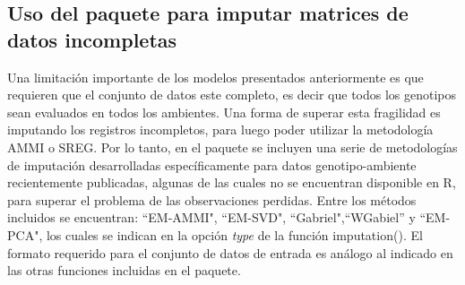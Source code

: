 

\subsection{Uso del paquete para imputar matrices de datos incompletas}
\label{subsec:metimp}

Una limitación importante de los modelos presentados anteriormente es que requieren que el conjunto de datos este completo, es decir que todos los genotipos sean evaluados en todos los ambientes. Una forma de superar esta fragilidad es imputando los registros incompletos, para luego poder utilizar la metodología AMMI o SREG. Por lo tanto, en el paquete se incluyen una serie de metodologías de imputación desarrolladas específicamente para datos genotipo-ambiente recientemente publicadas, algunas de las cuales no se encuentran disponible en R, para superar el problema de las observaciones perdidas. Entre los métodos incluidos se encuentran: ``EM-AMMI", ``EM-SVD", ``Gabriel",``WGabiel''  y ``EM-PCA", los cuales se indican en la opción \emph{type} de la función \textcolor{fandango}{imputation()}. El formato requerido para el conjunto de datos de entrada es análogo al indicado en las otras funciones incluidas en el paquete. 


